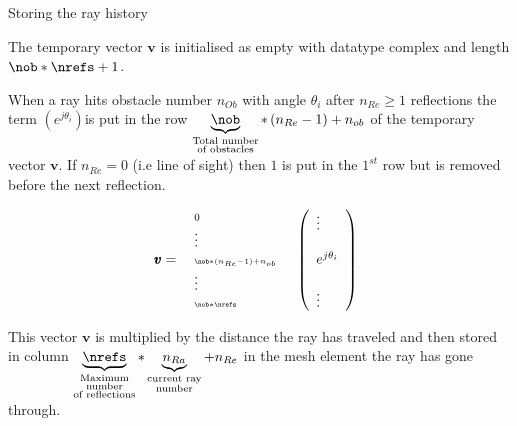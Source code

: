 \documentclass[8pt]{beamer}
\begin{document}
\begin{frame}
\begin{block}{Storing the ray history}
\par The temporary vector $\pmb{v}$ is initialised as empty with datatype complex and length $\nob *\nrefs +1$.
\par When a ray hits obstacle number $n_{Ob}$ with angle $\theta_i$ after $n_{Re}\geq 1$ reflections the term $(e^{j\theta_i})$\footnotemark[1] is put in the row $\underbrace{\nob}_{\substack{\text{Total number} \\ \text{of obstacles}}}*\left(n_{Re}-1\right)+n_{ob}$ of the temporary vector $\pmb{v}$. 
\pause If $n_{Re}=0$ (i.e line of sight) then $1$ is put in the $1^{st}$ row but is removed before the next reflection.
\begin{minipage}{0.4\linewidth}
\[\pmb{v}=  \begin{array}{ll}
\begin{array}{l}
    \scriptstyle{0} \\ \vdots \\ \scriptscriptstyle{\nob*(n_{Re}-1)+n_{ob}}  \\ \vdots \\ \scriptscriptstyle{\nob*\nrefs}
  \end{array} 
  & \left( \begin{array}{l}
    \vdots \\ \\ e^{j\theta_i}  \\  \\ \vdots \\
  \end{array} \right)
  \end{array} \]
\end{minipage}%
\begin{minipage}{\sepwid}
\mbox{}
\end{minipage}%
\begin{minipage}{0.5\linewidth}
\pause
This vector $\pmb{v}$ is multiplied by the distance the ray has traveled and then stored in column $\underbrace{\nrefs}_{\substack{\text{Maximum}\\ \text{number} \\ \text{of reflections}}}*\underbrace{n_{Ra}}_{\substack{\text{current ray} \\ \text{number}}}+n_{Re}$ in the mesh element the ray has gone through\footnotemark[2].
\end{minipage}
\end{block}
\end{frame}
\end{document}
